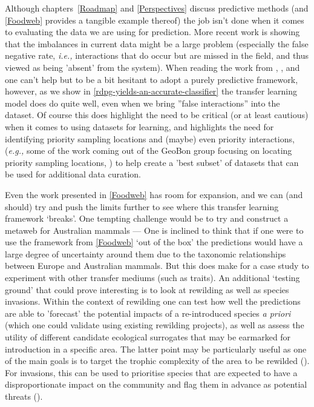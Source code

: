 \begin{refsection}
Although chapters~\ref{Roadmap} and \ref{Perspectives} discuss predictive methods (and \autoref{Foodweb} provides a tangible example thereof) the job isn't done when it comes to evaluating the data we are using for prediction. More recent work is showing that the imbalances in current data might be a large problem (especially the false negative rate, \emph{i.e.,} interactions that do occur but are missed in the field, and thus viewed as being 'absent' from the system). When reading the work from \cite{Brimacombe2023Shortcomings}, \cite{Catchen2023Missing}, and \cite{Poisot2023Guidelines} one can't help but to be a bit hesitant to adopt a purely predictive framework, however, as we show in \autoref{rdpg-yields-an-accurate-classifier} the transfer learning model does do quite well, even when we bring ''false interactions'' into the dataset. Of course this does highlight the need to be critical (or at least cautious) when it comes to using datasets for learning, and highlights the need for identifying priority sampling locations and (maybe) even priority interactions, (\emph{e.g.,} some of the work coming out of the GeoBon group focusing on locating priority sampling locations, \cite{2022Biodiversityobservationnetworks}) to help create a 'best subset' of datasets that can be used for additional data curation.

Even the work presented in \autoref{Foodweb} has room for expansion, and we can (and should) try and push the limits further to see where this transfer learning framework `breaks'. One tempting challenge would be to try and construct a metaweb for Australian mammals --- One is inclined to think that if one were to use the framework from \autoref{Foodweb} `out of the box' the predictions would have a large degree of uncertainty around them due to the taxonomic relationships between Europe and Australian mammals. But this does make for a case study to experiment with other transfer mediums (such as traits). An additional `testing ground' that could prove interesting is to look at rewilding as well as species invasions. Within the context of rewilding one can test how well the predictions are able to 'forecast' the potential impacts of a re-introduced species \emph{a priori} (which one could validate using existing rewilding projects), as well as assess the utility of different candidate ecological surrogates that may be earmarked for introduction in a specific area. The latter point may be particularly useful as one of the main goals is to target the trophic complexity of the area to be rewilded (\cite{Perino2019Rewilding}). For invasions, this can be used to prioritise species that are expected to have a disproportionate impact on the community and flag them in advance as potential threats (\cite{David2017Chapter}).


\end{refsection}
